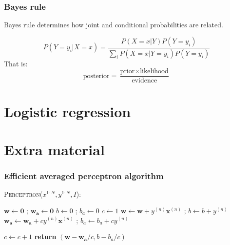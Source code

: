 \documentclass[14pt,mathserif]{beamer}
\newcommand{\vecb}[1]{\mathbf{#1}}
\newcommand{\x}{\mathbf{x}}
\begin{document}
\begin{frame}
  \frametitle{Bayes rule} Bayes rule determines how joint and
  conditional probabilities are related.
 
  \begin{block}{}
\[
    P(Y=y_i|X=x) = \frac{P(X=x|Y) P(Y=y_i)}{\sum_i P(X=x|Y=y_i)
      P(Y=y_i)}
\]
That is:
\[
\mbox{posterior} = \frac{\mbox{prior} \times \mbox{likelihood}}{\mbox{evidence}}
\]
\end{block}
\end{frame}

\section{Logistic regression}

\section{Extra material}
\begin{frame}
\frametitle{Efficient averaged perceptron algorithm}
 \begin{block}{\textsc{Perceptron}($x^{1:N},y^{1:N},I$):}
\begin{algorithmic}[1]
\STATE $\vecb{w} \leftarrow \vecb{0}$ ; $\vecb{w_a} \leftarrow \vecb{0}$
\STATE $b \leftarrow 0$ ; $b_a \leftarrow 0$
\STATE $c \leftarrow 1$
    		\IF {$y^{(n)} (\vecb{w}\cdot \x^{(n)}+b) \leq 0$}
        		\STATE $\vecb{w} \leftarrow \vecb{w} + y^{(n)} \x^{(n)}$ ; $b \leftarrow b + y^{(n)}$
			\STATE $\vecb{w_a} \leftarrow \vecb{w_a} + c y^{(n)} \x^{(n)}$ ; $b_a \leftarrow b_a + c y^{(n)}$

    		\ENDIF
        \STATE $c \leftarrow c + 1$
    	\ENDFOR
\ENDFOR
\STATE \textbf{return} $(\vecb{w}-\vecb{w_a}/c, b - b_a/c)$
\end{algorithmic}                 \end{block}
\end{frame}
\end{document}
